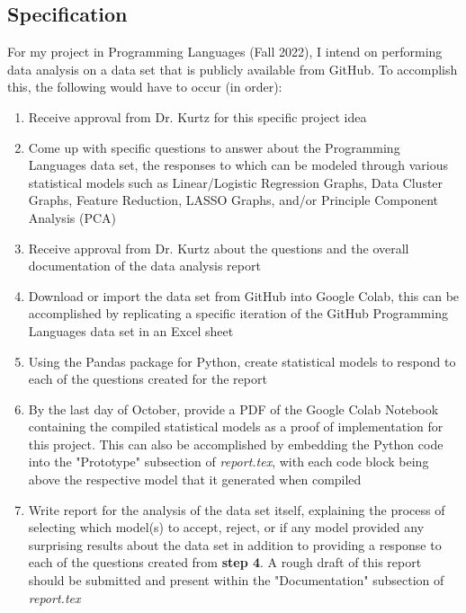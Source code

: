 \documentclass{article}
\theoremstyle{theorem}
\theoremstyle{definition}
\theoremstyle{remark}
\begin{document}
\subsection{Specification}
For my project in Programming Languages (Fall 2022), I intend on performing data analysis on a data set that is publicly available from GitHub. To accomplish this, the following would have to occur (in order):
\begin{enumerate}
    \item Receive approval from Dr. Kurtz for this specific project idea
    \item Come up with specific questions to answer about the Programming Languages data set, the responses to which can be modeled through various statistical models such as Linear/Logistic Regression Graphs, Data Cluster Graphs, Feature Reduction, LASSO Graphs, and/or Principle Component Analysis (PCA)
    \item Receive approval from Dr. Kurtz about the questions and the overall documentation of the data analysis report
    \item Download or import the data set from GitHub into Google Colab, this can be accomplished by replicating a specific iteration of the GitHub Programming Languages data set in an Excel sheet
    \item Using the Pandas package for Python, create statistical models to respond to each of the questions created for the report
    \item By the last day of October, provide a PDF of the Google Colab Notebook containing the compiled statistical models as a proof of implementation for this project. This can also be accomplished by embedding the Python code into the "Prototype" subsection of \textit{report.tex}, with each code block being above the respective model that it generated when compiled
    \item Write report for the analysis of the data set itself, explaining the process of selecting which model(s) to accept, reject, or if any model provided any surprising results about the data set in addition to providing a response to each of the questions created from \textbf{step 4}. A rough draft of this report should be submitted and present within the "Documentation" subsection of \textit{report.tex}
\end{enumerate}
\end{document}

